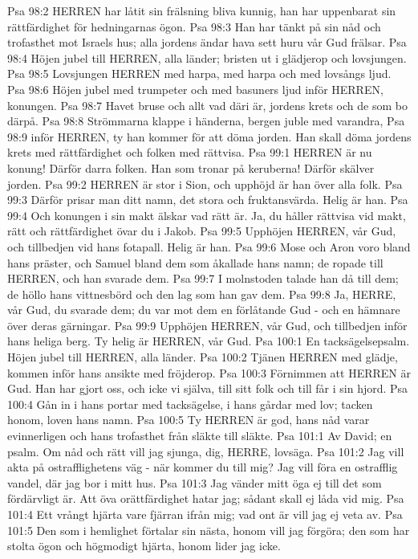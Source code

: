 Psa 98:2  HERREN har låtit sin frälsning bliva kunnig, han har uppenbarat sin rättfärdighet för hedningarnas ögon.
Psa 98:3  Han har tänkt på sin nåd och trofasthet mot Israels hus; alla jordens ändar hava sett huru vår Gud frälsar.
Psa 98:4  Höjen jubel till HERREN, alla länder; bristen ut i glädjerop och lovsjungen.
Psa 98:5  Lovsjungen HERREN med harpa, med harpa och med lovsångs ljud.
Psa 98:6  Höjen jubel med trumpeter och med basuners ljud inför HERREN, konungen.
Psa 98:7  Havet bruse och allt vad däri är, jordens krets och de som bo därpå.
Psa 98:8  Strömmarna klappe i händerna, bergen juble med varandra,
Psa 98:9  inför HERREN, ty han kommer för att döma jorden. Han skall döma jordens krets med rättfärdighet och folken med rättvisa.
Psa 99:1  HERREN är nu konung! Därför darra folken. Han som tronar på keruberna! Därför skälver jorden.
Psa 99:2  HERREN är stor i Sion, och upphöjd är han över alla folk.
Psa 99:3  Därför prisar man ditt namn, det stora och fruktansvärda. Helig är han.
Psa 99:4  Och konungen i sin makt älskar vad rätt är. Ja, du håller rättvisa vid makt, rätt och rättfärdighet övar du i Jakob.
Psa 99:5  Upphöjen HERREN, vår Gud, och tillbedjen vid hans fotapall. Helig är han.
Psa 99:6  Mose och Aron voro bland hans präster, och Samuel bland dem som åkallade hans namn; de ropade till HERREN, och han svarade dem.
Psa 99:7  I molnstoden talade han då till dem; de höllo hans vittnesbörd och den lag som han gav dem.
Psa 99:8  Ja, HERRE, vår Gud, du svarade dem; du var mot dem en förlåtande Gud - och en hämnare över deras gärningar.
Psa 99:9  Upphöjen HERREN, vår Gud, och tillbedjen inför hans heliga berg. Ty helig är HERREN, vår Gud.
Psa 100:1  En tacksägelsepsalm. Höjen jubel till HERREN, alla länder.
Psa 100:2  Tjänen HERREN med glädje, kommen inför hans ansikte med fröjderop.
Psa 100:3  Förnimmen att HERREN är Gud. Han har gjort oss, och icke vi själva, till sitt folk och till får i sin hjord.
Psa 100:4  Gån in i hans portar med tacksägelse, i hans gårdar med lov; tacken honom, loven hans namn.
Psa 100:5  Ty HERREN är god, hans nåd varar evinnerligen och hans trofasthet från släkte till släkte.
Psa 101:1  Av David; en psalm. Om nåd och rätt vill jag sjunga, dig, HERRE, lovsäga.
Psa 101:2  Jag vill akta på ostrafflighetens väg - när kommer du till mig? Jag vill föra en ostrafflig vandel, där jag bor i mitt hus.
Psa 101:3  Jag vänder mitt öga ej till det som fördärvligt är. Att öva orättfärdighet hatar jag; sådant skall ej låda vid mig.
Psa 101:4  Ett vrångt hjärta vare fjärran ifrån mig; vad ont är vill jag ej veta av.
Psa 101:5  Den som i hemlighet förtalar sin nästa, honom vill jag förgöra; den som har stolta ögon och högmodigt hjärta, honom lider jag icke.
